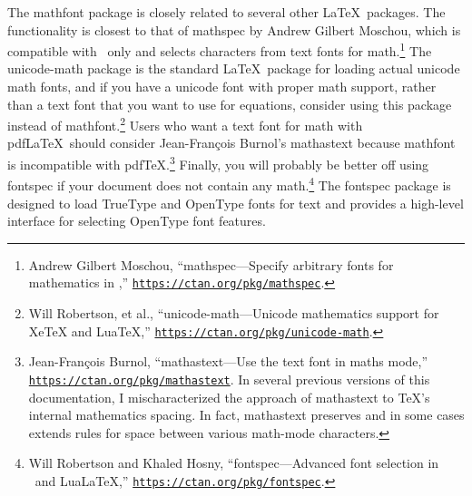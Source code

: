 \documentclass[12pt,twoside]{article}
\def\link#1{\href{#1}{\nolinkurl{#1}}}
\begin{document}
The \textsf{mathfont} package is closely related to several other \LaTeX\ packages. The functionality is closest to that of \textsf{mathspec} by Andrew Gilbert Moschou, which is compatible with \XeTeX\ only and selects characters from text fonts for math.\footnote{Andrew Gilbert Moschou, ``\textsf{mathspec}---Specify arbitrary fonts for mathematics in \XeTeX,'' \link{https://ctan.org/pkg/mathspec}.} The \textsf{unicode-math} package is the standard \LaTeX\ package for loading actual unicode math fonts, and if you have a unicode font with proper math support, rather than a text font that you want to use for equations, consider using this package instead of \textsf{mathfont}.\footnote{Will Robertson, et al., ``\textsf{unicode-math}---Unicode mathematics support for XeTeX and LuaTeX,'' \link{https://ctan.org/pkg/unicode-math}.} Users who want a text font for math with pdf\LaTeX\ should consider Jean-Fran\c cois Burnol's \textsf{mathastext} because \textsf{mathfont} is incompatible with pdf\TeX.\footnote{Jean-Fran\c cois Burnol, ``\textsf{mathastext}---Use the text font in maths mode,'' \link{https://ctan.org/pkg/mathastext}. In several previous versions of this documentation, I mischaracterized the approach of \textsf{mathastext} to \TeX's internal mathematics spacing. In fact, \textsf{mathastext} preserves and in some cases extends rules for space between various math-mode characters.} Finally, you will probably be better off using \textsf{fontspec} if your document does not contain any math.\footnote{Will Robertson and Khaled Hosny, ``\textsf{fontspec}---Advanced font selection in \XeLaTeX\ and Lua\LaTeX,'' \link{https://ctan.org/pkg/fontspec}.} The \textsf{fontspec} package is designed to load TrueType and OpenType fonts for text and provides a high-level interface for selecting OpenType font features.
\end{document}
